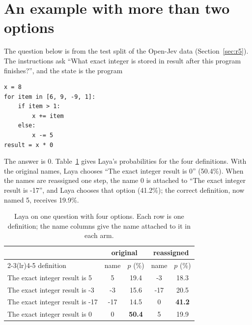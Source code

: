 \documentclass[11pt]{article}
\newcommand{\opt}[1]{\textsf{#1}}          %
\begin{document}
\section{An example with more than two options}
\label{app:multiway}
The question below is from the test split of the Open-Jev data (Section~\ref{sec:r5}). The
instructions ask ``What exact integer is stored in result after this program finishes?'', and the
state is the program
\begin{verbatim}
x = 8
for item in [6, 9, -9, 1]:
    if item > 1:
        x += item
    else:
        x -= 5
result = x * 0
\end{verbatim}
The answer is 0. Table~\ref{tab:mwexample} gives Laya's probabilities for the four definitions. With
the original names, Laya chooses ``The exact integer result is 0'' (50.4\%). When the names are
reassigned one step, the name \opt{0} is attached to ``The exact integer result is -17'', and Laya
chooses that option (41.2\%); the correct definition, now named \opt{5}, receives 19.9\%.
\begin{table}[h]
\centering\footnotesize
\setlength{\tabcolsep}{3pt}
\begin{tabular}{@{}lcccc@{}}
\toprule
 & \multicolumn{2}{c}{original} & \multicolumn{2}{c}{reassigned} \\
\cmidrule(lr){2-3}\cmidrule(lr){4-5}
definition & name & $p$ (\%) & name & $p$ (\%) \\
\midrule
The exact integer result is 5   & \opt{5}   & 19.4 & \opt{-3}  & 18.3 \\
The exact integer result is -3  & \opt{-3}  & 15.6 & \opt{-17} & 20.5 \\
The exact integer result is -17 & \opt{-17} & 14.5 & \opt{0}   & \textbf{41.2} \\
The exact integer result is 0   & \opt{0}   & \textbf{50.4} & \opt{5} & 19.9 \\
\bottomrule
\end{tabular}
\caption{Laya on one question with four options. Each row is one definition; the name columns give
the name attached to it in each arm.}
\label{tab:mwexample}
\end{table}
\end{document}
